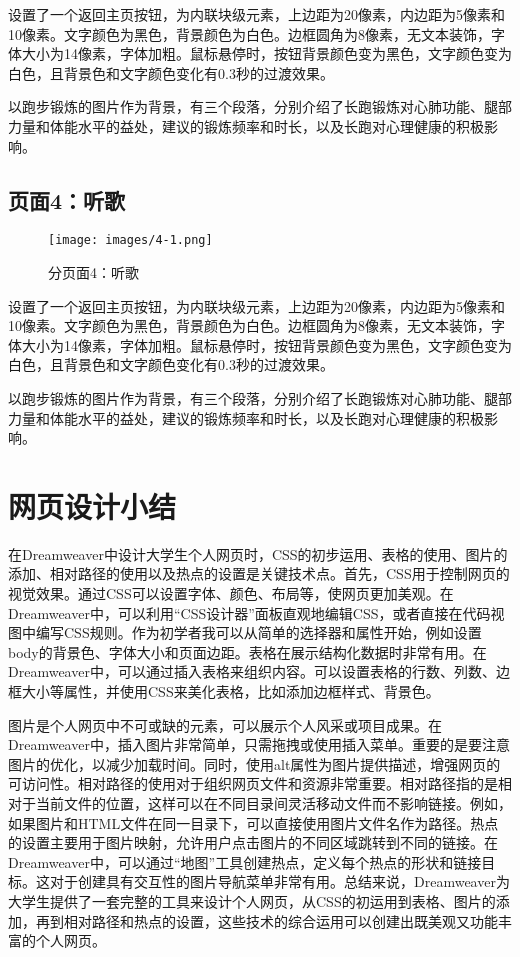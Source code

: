 \documentclass[supercite]{Experimental_Report}
\theoremstyle{definition}
\begin{document}
设置了一个返回主页按钮，为内联块级元素，上边距为20像素，内边距为5像素和10像素。文字颜色为黑色，背景颜色为白色。边框圆角为8像素，无文本装饰，字体大小为14像素，字体加粗。鼠标悬停时，按钮背景颜色变为黑色，文字颜色变为白色，且背景色和文字颜色变化有0.3秒的过渡效果。

以跑步锻炼的图片作为背景，有三个段落，分别介绍了长跑锻炼对心肺功能、腿部力量和体能水平的益处，建议的锻炼频率和时长，以及长跑对心理健康的积极影响。

\newpage
\subsection{页面4：听歌}

\begin{figure}[htb]
	\begin{center}
		\texttt{[image: images/4-1.png]}
		\caption{分页面4：听歌}
		\label{fig4-1}
	\end{center}
\end{figure}

设置了一个返回主页按钮，为内联块级元素，上边距为20像素，内边距为5像素和10像素。文字颜色为黑色，背景颜色为白色。边框圆角为8像素，无文本装饰，字体大小为14像素，字体加粗。鼠标悬停时，按钮背景颜色变为黑色，文字颜色变为白色，且背景色和文字颜色变化有0.3秒的过渡效果。

以跑步锻炼的图片作为背景，有三个段落，分别介绍了长跑锻炼对心肺功能、腿部力量和体能水平的益处，建议的锻炼频率和时长，以及长跑对心理健康的积极影响。

\newpage

\section{网页设计小结}

在Dreamweaver中设计大学生个人网页时，CSS的初步运用、表格的使用、图片的添加、相对路径的使用以及热点的设置是关键技术点。首先，CSS用于控制网页的视觉效果。通过CSS可以设置字体、颜色、布局等，使网页更加美观。在Dreamweaver中，可以利用“CSS设计器”面板直观地编辑CSS，或者直接在代码视图中编写CSS规则。作为初学者我可以从简单的选择器和属性开始，例如设置body的背景色、字体大小和页面边距。表格在展示结构化数据时非常有用。在Dreamweaver中，可以通过插入表格来组织内容。可以设置表格的行数、列数、边框大小等属性，并使用CSS来美化表格，比如添加边框样式、背景色。
 
图片是个人网页中不可或缺的元素，可以展示个人风采或项目成果。在Dreamweaver中，插入图片非常简单，只需拖拽或使用插入菜单。重要的是要注意图片的优化，以减少加载时间。同时，使用alt属性为图片提供描述，增强网页的可访问性。相对路径的使用对于组织网页文件和资源非常重要。相对路径指的是相对于当前文件的位置，这样可以在不同目录间灵活移动文件而不影响链接。例如，如果图片和HTML文件在同一目录下，可以直接使用图片文件名作为路径。热点的设置主要用于图片映射，允许用户点击图片的不同区域跳转到不同的链接。在Dreamweaver中，可以通过“地图”工具创建热点，定义每个热点的形状和链接目标。这对于创建具有交互性的图片导航菜单非常有用。总结来说，Dreamweaver为大学生提供了一套完整的工具来设计个人网页，从CSS的初运用到表格、图片的添加，再到相对路径和热点的设置，这些技术的综合运用可以创建出既美观又功能丰富的个人网页。
\end{document}
